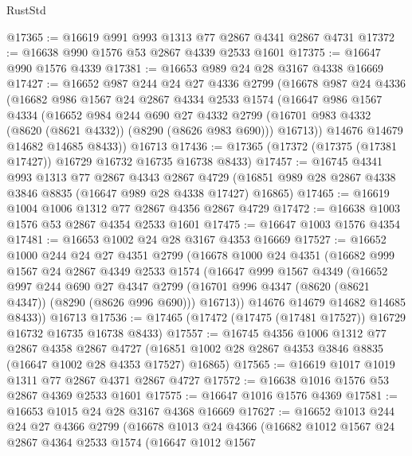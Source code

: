 \begin{lexlean}{RustStd}
\begin{coremodule}
@17365 := @16619 @991 @993 @1313 @77 @2867 @4341 @2867 @4731
@17372 := @16638 @990 @1576 @53 @2867 @4339 @2533 @1601
@17375 := @16647 @990 @1576 @4339
@17381 := @16653 @989 @24 @28 @3167 @4338 @16669
@17427 := @16652
    @987
    @244
    @24
    @27
    @4336
    @2799
    (@16678
      @987
      @24
      @4336
      (@16682
        @986
        @1567
        @24
        @2867
        @4334
        @2533
        @1574
        (@16647
          @986
          @1567
          @4334
          (@16652
            @984
            @244
            @690
            @27
            @4332
            @2799
            (@16701 @983 @4332 (@8620 (@8621 @4332)) (@8290 (@8626 @983 @690)))
            @16713))
        @14676
        @14679
        @14682
        @14685
        @8433))
    @16713
@17436 := @17365 (@17372 (@17375 (@17381 @17427)) @16729 @16732 @16735 @16738 @8433)
@17457 := @16745
    @4341
    @993
    @1313
    @77
    @2867
    @4343
    @2867
    @4729
    (@16851 @989 @28 @2867 @4338 @3846 @8835 (@16647 @989 @28 @4338 @17427) @16865)
@17465 := @16619 @1004 @1006 @1312 @77 @2867 @4356 @2867 @4729
@17472 := @16638 @1003 @1576 @53 @2867 @4354 @2533 @1601
@17475 := @16647 @1003 @1576 @4354
@17481 := @16653 @1002 @24 @28 @3167 @4353 @16669
@17527 := @16652
    @1000
    @244
    @24
    @27
    @4351
    @2799
    (@16678
      @1000
      @24
      @4351
      (@16682
        @999
        @1567
        @24
        @2867
        @4349
        @2533
        @1574
        (@16647
          @999
          @1567
          @4349
          (@16652
            @997
            @244
            @690
            @27
            @4347
            @2799
            (@16701 @996 @4347 (@8620 (@8621 @4347)) (@8290 (@8626 @996 @690)))
            @16713))
        @14676
        @14679
        @14682
        @14685
        @8433))
    @16713
@17536 := @17465 (@17472 (@17475 (@17481 @17527)) @16729 @16732 @16735 @16738 @8433)
@17557 := @16745
    @4356
    @1006
    @1312
    @77
    @2867
    @4358
    @2867
    @4727
    (@16851 @1002 @28 @2867 @4353 @3846 @8835 (@16647 @1002 @28 @4353 @17527) @16865)
@17565 := @16619 @1017 @1019 @1311 @77 @2867 @4371 @2867 @4727
@17572 := @16638 @1016 @1576 @53 @2867 @4369 @2533 @1601
@17575 := @16647 @1016 @1576 @4369
@17581 := @16653 @1015 @24 @28 @3167 @4368 @16669
@17627 := @16652
    @1013
    @244
    @24
    @27
    @4366
    @2799
    (@16678
      @1013
      @24
      @4366
      (@16682
        @1012
        @1567
        @24
        @2867
        @4364
        @2533
        @1574
        (@16647
          @1012
          @1567

\end{coremodule}
\end{lexlean}
